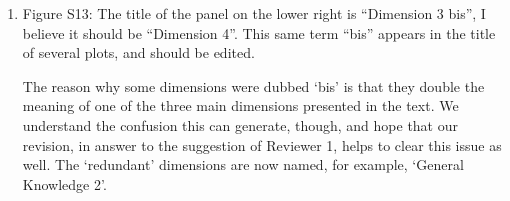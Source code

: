 \documentclass{article}
\newcommand{\comment}[1]{{\color{Blue}#1}}
\begin{document}
\begin{enumerate}
    \item Figure S13: The title of the panel on the lower right is “Dimension 3 bis”, I believe it should be “Dimension 4”. This same term “bis” appears in the title of several plots, and should be edited.
    
    \comment{The reason why some dimensions were dubbed `bis' is that they double the meaning of one of the three main dimensions presented in the text. We understand the confusion this can generate, though, and hope that our revision, in answer to the suggestion of Reviewer 1, helps to clear this issue as well. The `redundant' dimensions are now named, for example, `General Knowledge 2'. }
 
\end{enumerate}


\end{document}
